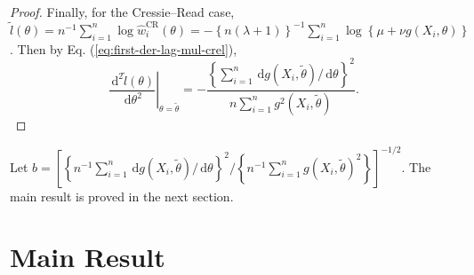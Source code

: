 \documentclass[oneside,english]{amsbook}
\numberwithin{section}{chapter}
\numberwithin{equation}{section}
\numberwithin{figure}{section}
\theoremstyle{plain}
\theoremstyle{plain}
\theoremstyle{definition}
\theoremstyle{plain}
\theoremstyle{plain}
\theoremstyle{remark}
\theoremstyle{definition}
\theoremstyle{definition}
\newcommand{\diff}{\,\mathrm{d}}
\begin{document}
\begin{proof}
Finally, for the Cressie--Read case, $\tilde{l}\left(\theta\right)=n^{-1}\sum_{i=1}^{n}\log\hat{w}_{i}^{\mathrm{CR}}\left(\theta\right)=-\left\{ n\left(\lambda+1\right)\right\} ^{-1}\sum_{i=1}^{n}\log\left\{ \mu+\nu g\left(X_{i},\theta\right)\right\} $.
Then by Eq. (\ref{eq:first-der-lag-mul-crel}), 
\[
\left.\frac{\diff^{2}\tilde{l}\left(\theta\right)}{\diff\theta^{2}}\right|_{\theta=\tilde{\theta}}=-\frac{\left\{ \sum_{i=1}^{n}\diff g\left(X_{i},\tilde{\theta}\right)/\diff\theta\right\} ^{2}}{n\sum_{i=1}^{n}g^{2}\left(X_{i},\tilde{\theta}\right)}.
\]

\end{proof}
Let $b=\left[\left\{ n^{-1}\sum_{i=1}^{n}\diff g\left(X_{i},\tilde{\theta}\right)/\diff\theta\right\} ^{2}/\left\{ n^{-1}\sum_{i=1}^{n}g\left(X_{i},\tilde{\theta}\right)^{2}\right\} \right]^{-1/2}$.
The main result is proved in the next section.


\section{Main Result}
\end{document}
